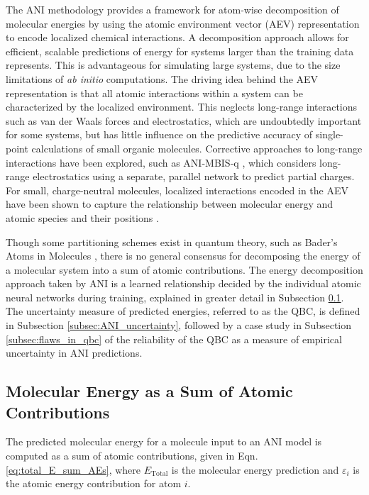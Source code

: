 The ANI methodology provides a framework for atom-wise decomposition of molecular energies by using the atomic environment vector (AEV) representation to encode localized chemical interactions.
A decomposition approach allows for efficient, scalable predictions of energy for systems larger than the training data represents.
This is advantageous for simulating large systems, due to the size limitations of \textit{ab initio} computations.
The driving idea behind the AEV representation is that all atomic interactions within a system can be characterized by the localized environment. 
This neglects long-range interactions such as van der Waals forces and electrostatics, which are undoubtedly important for some systems, but has little influence on the predictive accuracy of single-point calculations of small organic molecules.
Corrective approaches to long-range interactions have been explored, such as ANI-MBIS-q \cite{ml_mm_santi_y_jonny2}, which considers long-range electrostatics using a separate, parallel network to predict partial charges.
For small, charge-neutral molecules, localized interactions encoded in the AEV have been shown to capture the relationship between molecular energy and atomic species and their positions \cite{ani-1, ani-1x, ani-2x}.

Though some partitioning schemes exist in quantum theory, such as Bader's Atoms in Molecules \cite{bader_aim}, there is no general consensus for decomposing the energy of a molecular system into a sum of atomic contributions.
The energy decomposition approach taken by ANI is a learned relationship decided by the individual atomic neural networks during training, explained in greater detail in Subsection \ref{subsec:total_E_sum_AEs}.
The uncertainty measure of predicted energies, referred to as the QBC, is defined in Subsection \ref{subsec:ANI_uncertainty}, followed by a case study in Subsection \ref{subsec:flaws_in_qbc} of the reliability of the QBC as a measure of empirical uncertainty in ANI predictions.

\subsection{Molecular Energy as a Sum of Atomic Contributions}
\label{subsec:total_E_sum_AEs}

The predicted molecular energy for a molecule input to an ANI model is computed as a sum of atomic contributions, given in Eqn. \ref{eq:total_E_sum_AEs}, where $E_{\text{Total}}$ is the molecular energy prediction and $\varepsilon_i$ is the atomic energy contribution for atom $i$.

